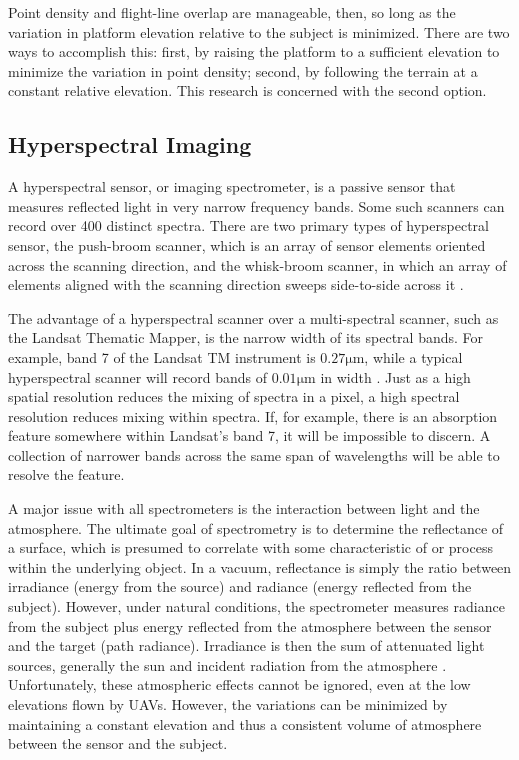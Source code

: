 \documentclass[10pt]{article}
\begin{document}
Point density and flight-line overlap are manageable, then, so long as the variation in platform elevation relative to the subject is minimized. There are two ways to accomplish this: first, by raising the platform to a sufficient elevation to minimize the variation in point density; second, by following the terrain at a constant relative elevation. This research is concerned with the second option.

\subsection{Hyperspectral Imaging}

A hyperspectral sensor, or imaging spectrometer, is a passive sensor that measures reflected light in very narrow frequency bands. Some such scanners can record over 400 distinct spectra. There are two primary types of hyperspectral sensor, the push-broom scanner, which is an array of sensor elements oriented across the scanning direction, and the whisk-broom scanner, in which an array of elements aligned with the scanning direction sweeps side-to-side across it \cite{Lillesand1999}.

The advantage of a hyperspectral scanner over a multi-spectral scanner, such as the Landsat Thematic Mapper, is the narrow width of its spectral bands. For example, band 7 of the Landsat TM instrument is $0.27\si{\um}$, while a typical hyperspectral scanner will record bands of $0.01\si{\um}$ in width \cite{Lillesand1999}. Just as a high spatial resolution reduces the mixing of spectra in a pixel, a high spectral resolution reduces mixing within spectra. If, for example, there is an absorption feature somewhere within Landsat's band 7, it will be impossible to discern. A collection of narrower  bands across the same span of wavelengths will be able to resolve the feature.

A major issue with all spectrometers is the interaction between light and the atmosphere. The ultimate goal of spectrometry is to determine the reflectance of a surface, which is presumed to correlate with some characteristic of or process within the underlying object. In a vacuum, reflectance is simply the ratio between irradiance (energy from the source) and radiance (energy reflected from the subject). However, under natural conditions, the spectrometer measures radiance from the subject plus energy reflected from the atmosphere between the sensor and the target (path radiance). Irradiance is then the sum of attenuated light sources, generally the sun and incident radiation from the atmosphere \cite{Lillesand1999}. Unfortunately, these atmospheric effects cannot be ignored, even at the low elevations flown by UAVs. However, the variations can be minimized by maintaining a constant elevation and thus a consistent volume of atmosphere between the sensor and the subject.
\end{document}
